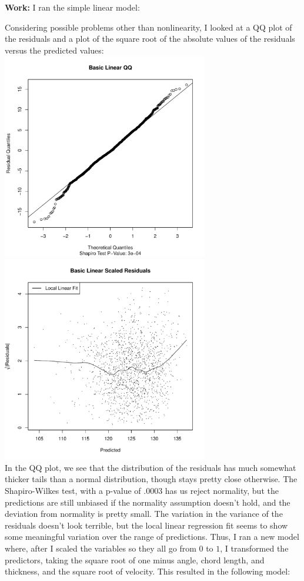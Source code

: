 \documentclass[11pt]{article}
\theoremstyle{definition}
\begin{document}
\begin{itemize}
\begin{itemize}
                {\bf Work:} I ran the simple linear model:
                
                Considering possible problems other than nonlinearity, I looked at a QQ plot of the residuals and a plot of the square root of the absolute values of the residuals versus the predicted values: \\ 
                \includegraphics[width=9cm]{final/1a_qq} 
                \includegraphics[width=9cm]{final/1a_sqrt_res_plot} \\ 
                In the QQ plot, we see that the distribution of the residuals has much somewhat thicker tails than a normal distribution, though stays pretty close otherwise. The Shapiro-Wilkes test, with a p-value of $.0003$ has us reject normality, but the predictions are still unbiased if the normality assumption doesn't hold, and the deviation from normality is pretty small. The variation in the variance of the residuals doesn't look terrible, but the local linear regression fit seems to show some meaningful variation over the range of predictions. Thus, I ran a new model where, after I scaled the variables so they all go from $0$ to $1$, I transformed the predictors, taking the square root of one minus angle, chord length, and thickness, and the square root of velocity. This resulted in the following model: \\

\end{itemize}
\end{itemize}
\end{document}
